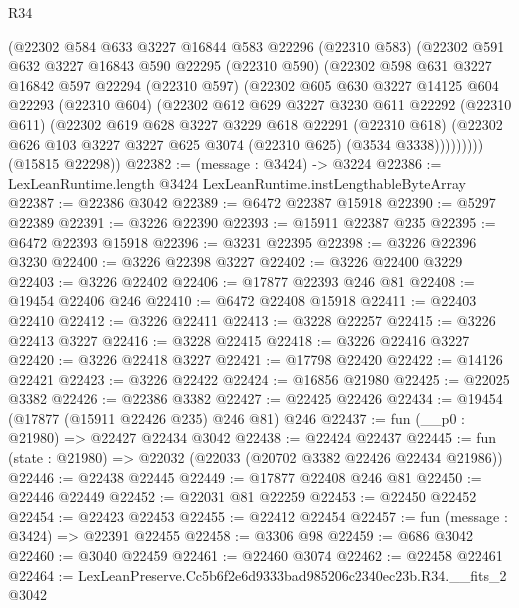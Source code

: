 \begin{lexlean}{R34}
\begin{coremodule}
        (@22302
          @584
          @633
          @3227
          @16844
          @583
          @22296
          (@22310 @583)
          (@22302
            @591
            @632
            @3227
            @16843
            @590
            @22295
            (@22310 @590)
            (@22302
              @598
              @631
              @3227
              @16842
              @597
              @22294
              (@22310 @597)
              (@22302
                @605
                @630
                @3227
                @14125
                @604
                @22293
                (@22310 @604)
                (@22302
                  @612
                  @629
                  @3227
                  @3230
                  @611
                  @22292
                  (@22310 @611)
                  (@22302
                    @619
                    @628
                    @3227
                    @3229
                    @618
                    @22291
                    (@22310 @618)
                    (@22302 @626 @103 @3227 @3227 @625 @3074 (@22310 @625) (@3534 @3338)))))))))
      (@15815 @22298))
@22382 := (message : @3424) -> @3224
@22386 := LexLeanRuntime.length @3424 LexLeanRuntime.instLengthableByteArray
@22387 := @22386 @3042
@22389 := @6472 @22387 @15918
@22390 := @5297 @22389
@22391 := @3226 @22390
@22393 := @15911 @22387 @235
@22395 := @6472 @22393 @15918
@22396 := @3231 @22395
@22398 := @3226 @22396 @3230
@22400 := @3226 @22398 @3227
@22402 := @3226 @22400 @3229
@22403 := @3226 @22402
@22406 := @17877 @22393 @246 @81
@22408 := @19454 @22406 @246
@22410 := @6472 @22408 @15918
@22411 := @22403 @22410
@22412 := @3226 @22411
@22413 := @3228 @22257
@22415 := @3226 @22413 @3227
@22416 := @3228 @22415
@22418 := @3226 @22416 @3227
@22420 := @3226 @22418 @3227
@22421 := @17798 @22420
@22422 := @14126 @22421
@22423 := @3226 @22422
@22424 := @16856 @21980
@22425 := @22025 @3382
@22426 := @22386 @3382
@22427 := @22425 @22426
@22434 := @19454 (@17877 (@15911 @22426 @235) @246 @81) @246
@22437 := fun (__p0 : @21980) => @22427 @22434 @3042
@22438 := @22424 @22437
@22445 := fun (state : @21980) => @22032 (@22033 (@20702 @3382 @22426 @22434 @21986))
@22446 := @22438 @22445
@22449 := @17877 @22408 @246 @81
@22450 := @22446 @22449
@22452 := @22031 @81 @22259
@22453 := @22450 @22452
@22454 := @22423 @22453
@22455 := @22412 @22454
@22457 := fun (message : @3424) => @22391 @22455
@22458 := @3306 @98
@22459 := @686 @3042
@22460 := @3040 @22459
@22461 := @22460 @3074
@22462 := @22458 @22461
@22464 := LexLeanPreserve.Cc5b6f2e6d9333bad985206c2340ec23b.R34.__fits_2 @3042

\end{coremodule}
\end{lexlean}
